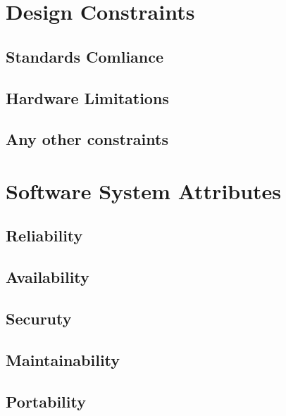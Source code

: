 \section{Design Constraints}
\subsection{Standards Comliance}
\subsection{Hardware Limitations}
\subsection{Any other constraints}

\section{Software System Attributes}
\subsection{Reliability}
\subsection{Availability}
\subsection{Securuty}
\subsection{Maintainability}
\subsection{Portability}